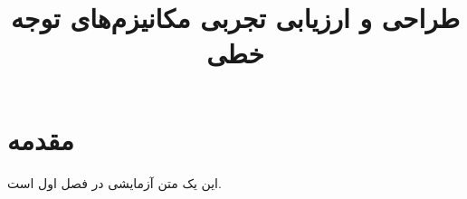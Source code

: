 \documentclass[bsc]{tehran-thesis}
\title{طراحی و ارزیابی تجربی مکانیزم‌های توجه خطی}
\begin{document}
\coverPage
\chapter{مقدمه}
این یک متن آزمایشی در فصل اول است.
\end{document}
